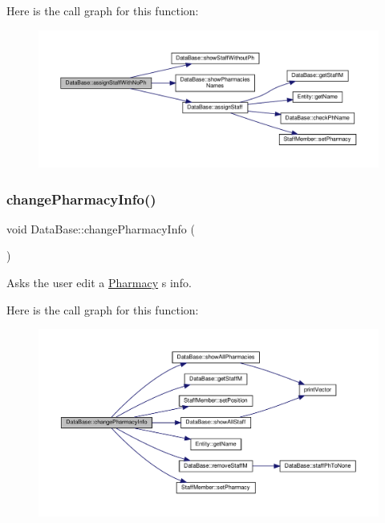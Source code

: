 Here is the call graph for this function\+:\nopagebreak
\begin{figure}[H]
\begin{center}
\leavevmode
\includegraphics[width=350pt]{classDataBase_a28237a8f74d11c092cf250d17c7997f1_cgraph}
\end{center}
\end{figure}
\mbox{\label{classDataBase_a9704dec1b0797bf3f6dc18a754a4a1b5}} 
\subsubsection{\texorpdfstring{change\+Pharmacy\+Info()}{changePharmacyInfo()}}
{\footnotesize\ttfamily void Data\+Base\+::change\+Pharmacy\+Info (\begin{DoxyParamCaption}{ }\end{DoxyParamCaption})}



Asks the user edit a \hyperlink{classPharmacy}{Pharmacy} \textquotesingle{}s info. 

Here is the call graph for this function\+:\nopagebreak
\begin{figure}[H]
\begin{center}
\leavevmode
\includegraphics[width=350pt]{classDataBase_a9704dec1b0797bf3f6dc18a754a4a1b5_cgraph}
\end{center}
\end{figure}
\mbox{\label{classDataBase_a33b218c5674029a4696a44d710f88aa6}} 
